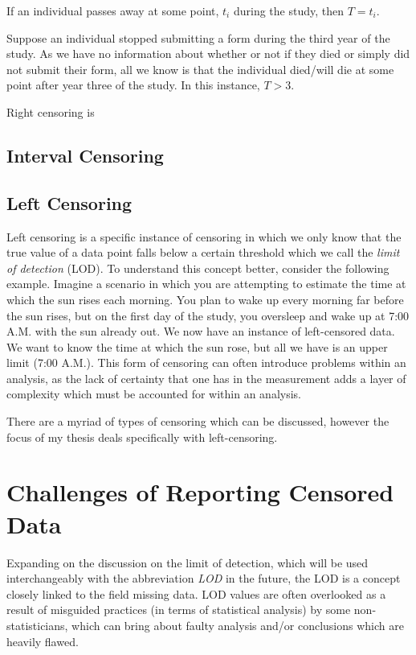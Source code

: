 \documentclass[12pt, twoside]{amherstthesis}
\begin{document}
If an individual passes away at some point, \(t_i\) during the study, then \(T = t_i\).

Suppose an individual stopped submitting a form during the third year of the study. As we have no information about whether or not if they died or simply did not submit their form, all we know is that the individual died/will die at some point after year three of the study. In this instance, \(T > 3\).

Right censoring is

\hypertarget{interval}{%
\subsection{Interval Censoring}\label{interval}}

\hypertarget{left}{%
\subsection{Left Censoring}\label{left}}

Left censoring is a specific instance of censoring in which we only know that the true value of a data point falls below a certain threshold which we call the \emph{limit of detection} (LOD). To understand this concept better, consider the following example. Imagine a scenario in which you are attempting to estimate the time at which the sun rises each morning. You plan to wake up every morning far before the sun rises, but on the first day of the study, you oversleep and wake up at 7:00 A.M. with the sun already out. We now have an instance of left-censored data. We want to know the time at which the sun rose, but all we have is an upper limit (7:00 A.M.). This form of censoring can often introduce problems within an analysis, as the lack of certainty that one has in the measurement adds a layer of complexity which must be accounted for within an analysis.

There are a myriad of types of censoring which can be discussed, however the focus of my thesis deals specifically with left-censoring.

\hypertarget{challenges}{%
\section{Challenges of Reporting Censored Data}\label{challenges}}

Expanding on the discussion on the limit of detection, which will be used interchangeably with the abbreviation \emph{LOD} in the future, the LOD is a concept closely linked to the field missing data. LOD values are often overlooked as a result of misguided practices (in terms of statistical analysis) by some non-statisticians, which can bring about faulty analysis and/or conclusions which are heavily flawed.
\end{document}
